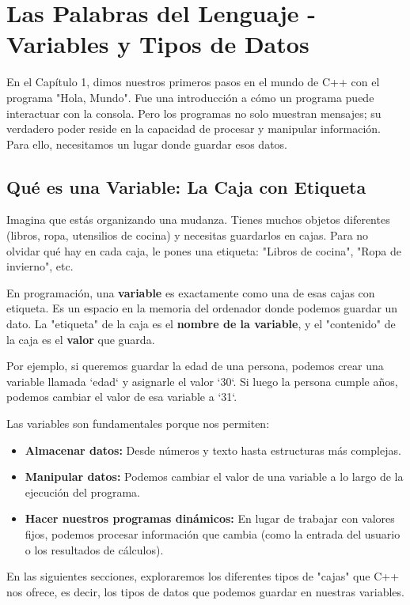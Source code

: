 \section{Las Palabras del Lenguaje - Variables y Tipos de Datos}
\label{sec:variables_tipos}

En el Capítulo 1, dimos nuestros primeros pasos en el mundo de C++ con el programa "Hola, Mundo". Fue una introducción a cómo un programa puede interactuar con la consola. Pero los programas no solo muestran mensajes; su verdadero poder reside en la capacidad de procesar y manipular información. Para ello, necesitamos un lugar donde guardar esos datos.

\subsection{Qué es una Variable: La Caja con Etiqueta}
\label{subsec:que_es_variable}

Imagina que estás organizando una mudanza. Tienes muchos objetos diferentes (libros, ropa, utensilios de cocina) y necesitas guardarlos en cajas. Para no olvidar qué hay en cada caja, le pones una etiqueta: "Libros de cocina", "Ropa de invierno", etc.

En programación, una \textbf{variable} es exactamente como una de esas cajas con etiqueta. Es un espacio en la memoria del ordenador donde podemos guardar un dato. La "etiqueta" de la caja es el \textbf{nombre de la variable}, y el "contenido" de la caja es el \textbf{valor} que guarda.

Por ejemplo, si queremos guardar la edad de una persona, podemos crear una variable llamada `edad` y asignarle el valor `30`. Si luego la persona cumple años, podemos cambiar el valor de esa variable a `31`.

Las variables son fundamentales porque nos permiten:
\begin{itemize}
    \item \textbf{Almacenar datos:} Desde números y texto hasta estructuras más complejas.
    \item \textbf{Manipular datos:} Podemos cambiar el valor de una variable a lo largo de la ejecución del programa.
    \item \textbf{Hacer nuestros programas dinámicos:} En lugar de trabajar con valores fijos, podemos procesar información que cambia (como la entrada del usuario o los resultados de cálculos).
\end{itemize}

En las siguientes secciones, exploraremos los diferentes tipos de "cajas" que C++ nos ofrece, es decir, los tipos de datos que podemos guardar en nuestras variables.

